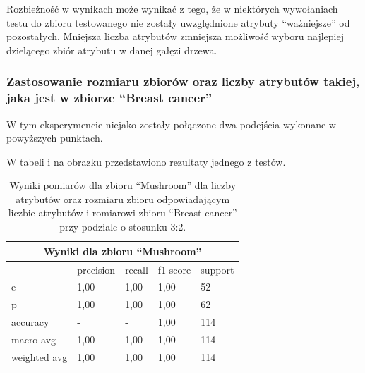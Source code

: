 Rozbieżność w wynikach może wynikać z tego, że w niektórych wywołaniach testu
do zbioru testowanego nie zostały uwzględnione atrybuty ``ważniejsze'' od
pozostałych. Mniejsza liczba atrybutów zmniejsza możliwość wyboru najlepiej
dzielącego zbiór atrybutu w danej gałęzi drzewa.

\subsubsection{Zastosowanie rozmiaru zbiorów oraz liczby atrybutów takiej, jaka
jest w zbiorze ``Breast cancer''}
W tym eksperymencie niejako zostały połączone dwa podejścia wykonane w
powyższych punktach.

W tabeli i na obrazku przedstawiono rezultaty jednego z testów.

\begin{table}[h!]
        \centering
        \begin{tabular}{ |p{2cm}|p{2cm}|p{2cm}|p{2cm}|p{2cm}| }
                \hline
                \multicolumn{5}{|c|}{Wyniki dla zbioru ``Mushroom''} \\
                \hline
                 & precision & recall & f1-score & support \\
                \hline
                e & 1,00 & 1,00 & 1,00 & 52 \\
                \hline
                p & 1,00 & 1,00 & 1,00 & 62 \\
                \hline
                accuracy & - & - & 1,00 & 114 \\
                \hline
                macro avg & 1,00 & 1,00 & 1,00 & 114 \\
                \hline
                weighted avg & 1,00 & 1,00 & 1,00 & 114 \\
                \hline
        \end{tabular}
        \caption{Wyniki pomiarów dla zbioru ``Mushroom'' dla liczby atrybutów oraz rozmiaru zbioru odpowiadającym liczbie atrybutów i romiarowi zbioru ``Breast cancer'' przy podziale o stosunku 3:2.}
\end{table}

